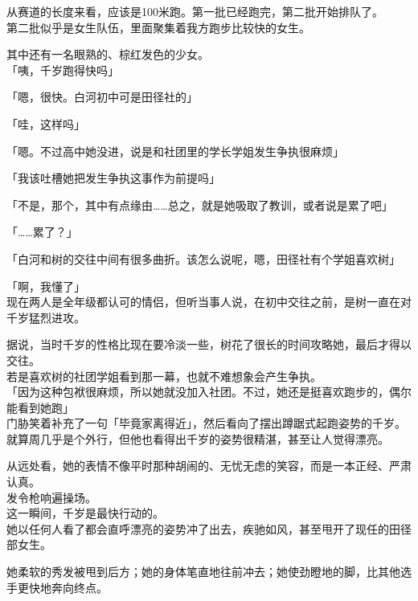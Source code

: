 从赛道的长度来看，应该是100米跑。第一批已经跑完，第二批开始排队了。\\

第二批似乎是女生队伍，里面聚集着我方跑步比较快的女生。

其中还有一名眼熟的、棕红发色的少女。\\

「咦，千岁跑得快吗」

「嗯，很快。白河初中可是田径社的」

「哇，这样吗」

「嗯。不过高中她没进，说是和社团里的学长学姐发生争执很麻烦」

「我该吐槽她把发生争执这事作为前提吗」

「不是，那个，其中有点缘由……总之，就是她吸取了教训，或者说是累了吧」

「……累了？」

「白河和树的交往中间有很多曲折。该怎么说呢，嗯，田径社有个学姐喜欢树」

「啊，我懂了」\\

现在两人是全年级都认可的情侣，但听当事人说，在初中交往之前，是树一直在对千岁猛烈进攻。

据说，当时千岁的性格比现在要冷淡一些，树花了很长的时间攻略她，最后才得以交往。\\

若是喜欢树的社团学姐看到那一幕，也就不难想象会产生争执。\\

「因为这种包袱很麻烦，所以她就没加入社团。不过，她还是挺喜欢跑步的，偶尔能看到她跑」\\

门胁笑着补充了一句「毕竟家离得近」，然后看向了摆出蹲踞式起跑姿势的千岁。\\

就算周几乎是个外行，但他也看得出千岁的姿势很精湛，甚至让人觉得漂亮。

从远处看，她的表情不像平时那种胡闹的、无忧无虑的笑容，而是一本正经、严肃认真。\\

发令枪响遍操场。\\

这一瞬间，千岁是最快行动的。\\

她以任何人看了都会直呼漂亮的姿势冲了出去，疾驰如风，甚至甩开了现任的田径部女生。

她柔软的秀发被甩到后方；她的身体笔直地往前冲去；她使劲瞪地的脚，比其他选手更快地奔向终点。\\

